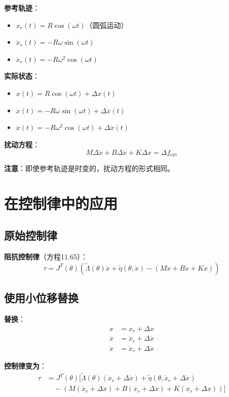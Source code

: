 \documentclass[12pt,a4paper]{article}
\begin{document}
\textbf{参考轨迹}：
\begin{itemize}
\item $x_r(t) = R\cos(\omega t)$（圆弧运动）
\item $\dot{x}_r(t) = -R\omega\sin(\omega t)$
\item $\ddot{x}_r(t) = -R\omega^2\cos(\omega t)$
\end{itemize}

\textbf{实际状态}：
\begin{itemize}
\item $x(t) = R\cos(\omega t) + \Delta x(t)$
\item $\dot{x}(t) = -R\omega\sin(\omega t) + \Delta \dot{x}(t)$
\item $\ddot{x}(t) = -R\omega^2\cos(\omega t) + \Delta \ddot{x}(t)$
\end{itemize}

\textbf{扰动方程}：
\begin{equation}
M\Delta \ddot{x} + B\Delta \dot{x} + K\Delta x = \Delta f_{\text{ext}}
\end{equation}

\textbf{注意}：即使参考轨迹是时变的，扰动方程的形式相同。

\section{在控制律中的应用}

\subsection{原始控制律}

\textbf{阻抗控制律}（方程11.65）：
\begin{equation}
\tau = J^T(\theta)\left(\tilde{\Lambda}(\theta)\ddot{x} + \tilde{\eta}(\theta, \dot{x}) - (M\ddot{x} + B\dot{x} + Kx)\right)
\end{equation}

\subsection{使用小位移替换}

\textbf{替换}：
\begin{align}
x &= x_r + \Delta x \\
\dot{x} &= \dot{x}_r + \Delta \dot{x} \\
\ddot{x} &= \ddot{x}_r + \Delta \ddot{x}
\end{align}

\textbf{控制律变为}：
\begin{align}
\tau &= J^T(\theta)\Big[\tilde{\Lambda}(\theta)(\ddot{x}_r + \Delta \ddot{x}) + \tilde{\eta}(\theta, \dot{x}_r + \Delta \dot{x}) \\
&\quad - (M(\ddot{x}_r + \Delta \ddot{x}) + B(\dot{x}_r + \Delta \dot{x}) + K(x_r + \Delta x))\Big]
\end{align}
\end{document}
